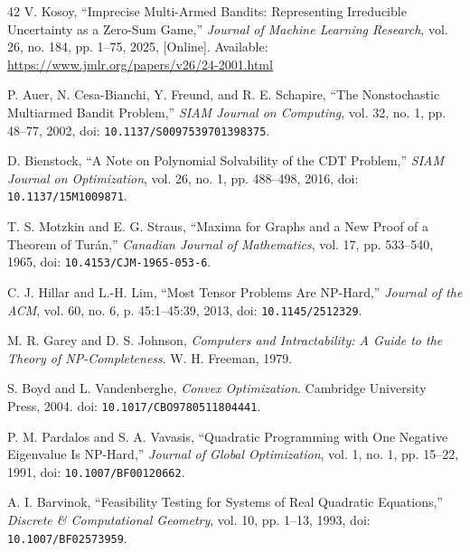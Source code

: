 \begingroup
\color{black}
\renewcommand{\refname}{\draft{References}}
\begin{thebibliography}{42}
V. Kosoy, ``Imprecise Multi-Armed Bandits: Representing Irreducible Uncertainty as a Zero-Sum Game,'' \emph{Journal of Machine Learning Research}, vol. 26, no. 184, pp. 1--75, 2025, [Online]. Available: \url{https://www.jmlr.org/papers/v26/24-2001.html}

P. Auer, N. Cesa-Bianchi, Y. Freund, and R. E. Schapire, ``The Nonstochastic Multiarmed Bandit Problem,'' \emph{SIAM Journal on Computing}, vol. 32, no. 1, pp. 48--77, 2002, doi: \nolinkurl{10.1137/S0097539701398375}.

D. Bienstock, ``A Note on Polynomial Solvability of the CDT Problem,'' \emph{SIAM Journal on Optimization}, vol. 26, no. 1, pp. 488--498, 2016, doi: \nolinkurl{10.1137/15M1009871}.

T. S. Motzkin and E. G. Straus, ``Maxima for Graphs and a New Proof of a Theorem of Tur\'{a}n,'' \emph{Canadian Journal of Mathematics}, vol. 17, pp. 533--540, 1965, doi: \nolinkurl{10.4153/CJM-1965-053-6}.

C. J. Hillar and L.-H. Lim, ``Most Tensor Problems Are NP-Hard,'' \emph{Journal of the ACM}, vol. 60, no. 6, p. 45:1--45:39, 2013, doi: \nolinkurl{10.1145/2512329}.

M. R. Garey and D. S. Johnson, \emph{Computers and Intractability: A Guide to the Theory of NP-Completeness}. W. H. Freeman, 1979.

S. Boyd and L. Vandenberghe, \emph{Convex Optimization}. Cambridge University Press, 2004. doi: \nolinkurl{10.1017/CBO9780511804441}.

P. M. Pardalos and S. A. Vavasis, ``Quadratic Programming with One Negative Eigenvalue Is NP-Hard,'' \emph{Journal of Global Optimization}, vol. 1, no. 1, pp. 15--22, 1991, doi: \nolinkurl{10.1007/BF00120662}.

A. I. Barvinok, ``Feasibility Testing for Systems of Real Quadratic Equations,'' \emph{Discrete \& Computational Geometry}, vol. 10, pp. 1--13, 1993, doi: \nolinkurl{10.1007/BF02573959}.


\end{thebibliography}
